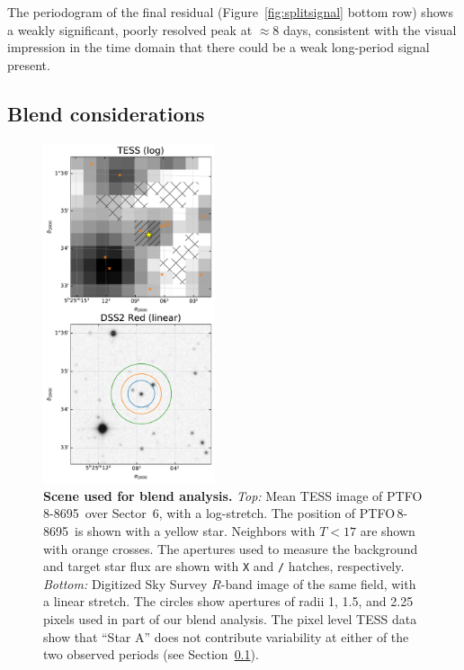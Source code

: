 \documentclass[12pt,twocolumn,tighten]{aastex62}
\newcommand{\ptfo}{PTFO$\,$8-8695}
\begin{document}
The periodogram of the final residual (Figure~\ref{fig:splitsignal}
bottom row) shows a weakly significant, poorly resolved peak at
$\approx$8 days, consistent with the visual impression in the time
domain that there could be a weak long-period signal present.


\subsection{Blend considerations}
\label{subsec:blend}

\begin{figure}[t]
	\begin{center}
		\leavevmode
		\includegraphics[width=0.45\textwidth]{f4.pdf}
	\end{center}
	\vspace{-0.7cm}
	\caption{ {\bf Scene used for blend analysis.}
		{\it Top:} Mean TESS image of \ptfo\ over Sector~6, with a
		log-stretch.  The position of \ptfo\ is shown with a yellow
		star.  Neighbors with $T<17$ are shown with orange crosses.  The
		apertures used to measure the background and target star flux are
		shown with \texttt{X} and \texttt{/} hatches, respectively.
		{\it Bottom:} Digitized Sky Survey $R$-band image of the same
		field, with a linear stretch. The circles show apertures of radii
		1, 1.5, and 2.25 pixels used in part of our blend analysis.  The
		pixel level TESS data show that ``Star A''  does not contribute
		variability at either of the two observed periods (see
		Section~\ref{subsec:blend}).
		\label{fig:scene}
	}
\end{figure}
\end{document}
